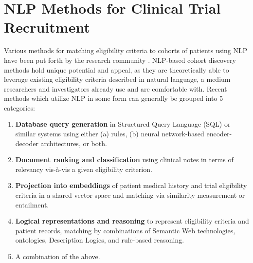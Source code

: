 \documentclass[../main.tex]{subfiles}
\begin{document}
\section{NLP Methods for Clinical Trial Recruitment}

Various methods for matching eligibility criteria to cohorts of patients using NLP have been put forth by the research community \cite{yuan2019criteria2query, soni2020patient, fang2022combining, zhang2020deepenroll, chen2019clinical, patrao2015recruit, dhayne2021emr2vec, liu2021evaluating, xiong2019cohort}. NLP-based cohort discovery methods hold unique potential and appeal, as they are theoretically able to leverage existing eligibility criteria described in natural language, a medium researchers and investigators already use and are comfortable with. Recent methods which utilize NLP in some form can generally be grouped into 5 categories:

\begin{enumerate}
    \item{\textbf{Database query generation} in Structured Query Language (SQL) or similar systems using either (a) rules, (b) neural network-based encoder-decoder architectures}, or both.
    \item{\textbf{Document ranking and classification} using clinical notes in terms of relevancy vis-à-vis a given eligibility criterion.}
    \item{\textbf{Projection into embeddings} of patient medical history and trial eligibility criteria in a shared vector space and matching via similarity measurement or entailment.}
    \item{\textbf{Logical representations and reasoning} to represent eligibility criteria and patient records, matching by combinations of Semantic Web technologies, ontologies, Description Logics, and rule-based reasoning.}
    \item{A combination of the above.}
\end{enumerate}
\end{document}
